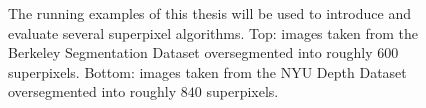 \begin{figure}
{	}
	\caption[The running examples of this thesis taken from the Berkeley Segmentation Dataset \cite{ArbelaezMaireFowlkesMalik:2011} and the NYU Depth Dataset \cite{SilbermanHoiemKohliFergus:2012}.]{The running examples of this thesis will be used to introduce and evaluate several superpixel algorithms. Top: images taken from the Berkeley Segmentation Dataset \cite{ArbelaezMaireFowlkesMalik:2011} oversegmented into roughly $600$ superpixels. Bottom: images taken from the NYU Depth Dataset \cite{SilbermanHoiemKohliFergus:2012} oversegmented into roughly $840$ superpixels.}
	\label{fig:introduction-running-examples}
\end{figure}


